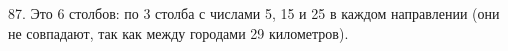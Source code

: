 87. Это 6 столбов: по 3 столба с числами 5, 15 и 25 в каждом направлении (они не совпадают, так как между городами 29 километров).\\
